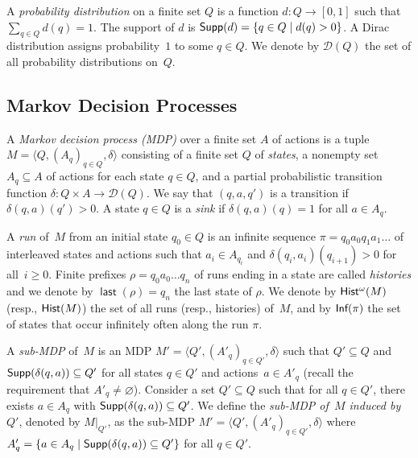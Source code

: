 \documentclass[a4paper,USenglish,cleveref, autoref, thm-restate]{lipics-v2021}
\let\emptyset\varnothing
\newcommand{\tuple}[1]{\langle #1 \rangle}
\newcommand\restr[2]{\ensuremath{\left.#1\right\rvert_{#2}}}
\newcommand\Supp{\textrm{\sf Supp}}
\newcommand\D{\mathcal{D}}
\renewcommand\H{{\sf Hist}}
\newcommand\R{{\sf Hist^{\omega}}}
\newcommand\Inf{\textrm{\sf Inf}}
\newcommand{\last}{\operatorname{\mathsf{last}}}
\begin{document}
A \emph{probability distribution} on a finite set $Q$ is a function 
$d: Q \to [0, 1]$ such that $\sum_{q \in Q} d(q) = 1$. 
The support of $d$ is $\Supp(d) = \{q \in Q \mid d(q) > 0\}$. 
A Dirac distribution assigns probability~$1$ to some $q \in Q$.
We denote by $\D(Q)$ the set of all probability distributions on~$Q$.

\subsection{Markov Decision Processes}
A \emph{Markov decision process (MDP)} over a finite set $A$ of actions
is a tuple $M = \tuple{Q, (A_q)_{q \in Q}, \delta}$ consisting
of a finite set $Q$ of \emph{states}, 
a nonempty set $A_q \subseteq A$ of actions for each state $q \in Q$, 
and a partial probabilistic transition function $\delta : Q \times A \to \D(Q)$.
We say that $(q,a,q')$ is a transition if $\delta(q,a)(q') > 0$.
A state $q \in Q$ is a \emph{sink} if $\delta(q,a)(q) = 1$ for all $a \in A_q$. 

A \emph{run} of~$M$ from an initial state $q_0 \in Q$ is an infinite sequence 
$\pi = q_0 a_0 q_1 a_1 \ldots $ of interleaved states and actions such that 
$a_i \in A_{q_i}$ and $\delta(q_i,a_i)(q_{i+1}) > 0$ for all~$i \geq 0$.
Finite prefixes $\rho = q_0 a_0 \ldots q_n$ of runs ending in a state 
are called \emph{histories} and we denote by $\last(\rho) = q_n$ the last 
state of $\rho$.
We denote by $\R(M)$ (resp., $\H(M)$) the set of all runs (resp., histories) of~$M$,
and by $\Inf(\pi)$ the set of states that occur infinitely often along the run $\pi$.


A \emph{sub-MDP} of~$M$ is an MDP $M' = \tuple{Q',(A'_q)_{q \in Q'},\delta}$ such that 
$Q' \subseteq Q$ and $\Supp(\delta(q,a)) \subseteq Q'$ for all states $q \in Q'$ and
actions~$a \in A'_q$ (recall the requirement that $A'_q \neq \emptyset$). 
Consider a set $Q' \subseteq Q$ such that for all $q \in Q'$, there exists $a \in A_q$ with 
$\Supp(\delta(q,a)) \subseteq Q'$. We define the \emph{sub-MDP of~$M$ induced by $Q'$}, 
denoted by $\restr{M}{Q'}$, as the sub-MDP 
$M' = \tuple{Q',(A'_q)_{q \in Q'},\delta}$ where
$A'_q = \{a \in A_q\mid \Supp(\delta(q,a)) \subseteq Q'\}$ for all $q \in Q'$.
\end{document}
